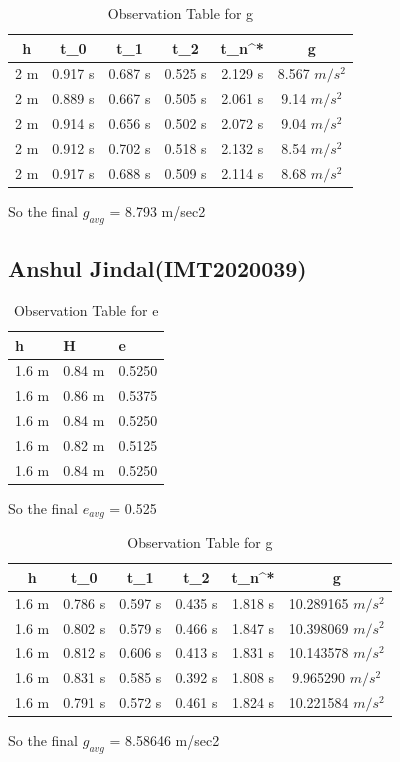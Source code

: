 \documentclass[11pt]{scrartcl} %
\begin{document}
\begin{table}[h]
\centering
\begin{tabular}{||c c c c c c||} 
\toprule
 \hline
 h & t_0 & t_1 & t_2 & t_n^* & g \\ [0.5ex] 
 \midrule
 \hline\hline
 2 m & 0.917 s & 0.687 s  & 0.525 s & 2.129 s & 8.567 $m/s^2$  \\ 
 \hline
 2 m & 0.889 s & 0.667 s & 0.505 s & 2.061 s & 9.14 $m/s^2$  \\
 \hline 
 2 m & 0.914 s & 0.656 s & 0.502 s & 2.072 s  & 9.04 $m/s^2$   \\
 \hline
 2 m & 0.912 s & 0.702 s & 0.518 s & 2.132 s  & 8.54 $m/s^2$   \\
 \hline
 2 m & 0.917 s & 0.688 s & 0.509 s & 2.114 s  & 8.68 $m/s^2$  \\ 
 [1ex]
 \bottomrule
 \hline
\end{tabular}
\caption{Observation Table for g}
\end{table}
So the final $g_{avg}$ = 8.793 m/sec2
\newpage
\subsection{Anshul Jindal(IMT2020039)}

\begin{table}[h] %
	\centering %
	\begin{tabular}{l l l}
		\toprule
		\textbf{h} & \textbf{H} & \textbf{e} \\
		\midrule
		1.6 m & 0.84 m & 0.5250\\
        1.6 m & 0.86 m & 0.5375\\
        1.6 m & 0.84 m & 0.5250\\
        1.6 m & 0.82 m & 0.5125 \\
        1.6 m & 0.84 m & 0.5250 \\
		\bottomrule
	\end{tabular}
	\caption{Observation Table for e}
\end{table}
So the final $e_{avg}$ = 0.525

\begin{table}[h]
\centering
\begin{tabular}{||c c c c c c||} 
\toprule
 \hline
 h & t_0 & t_1 & t_2 & t_n^* & g \\ [0.5ex] 
 \midrule
 \hline\hline
 1.6 m & 0.786 s & 0.597 s  & 0.435 s & 1.818 s & 10.289165 $m/s^2$ \\
 \hline
 1.6 m & 0.802 s & 0.579 s & 0.466 s & 1.847 s & 10.398069 $m/s^2$  \\
 \hline
 1.6 m & 0.812 s & 0.606 s & 0.413 s & 1.831 s  & 10.143578 $m/s^2$ \\
 \hline
 1.6 m & 0.831 s & 0.585 s & 0.392 s & 1.808 s  & 9.965290 $m/s^2$  \\
 \hline
 1.6 m & 0.791 s & 0.572 s & 0.461 s & 1.824 s  & 10.221584 $m/s^2$ \\ [1ex]
 \bottomrule
 \hline
\end{tabular}
\caption{Observation Table for g}
\end{table}
So the final $g_{avg}$ = 8.58646 m/sec2
\newpage
\end{document}
